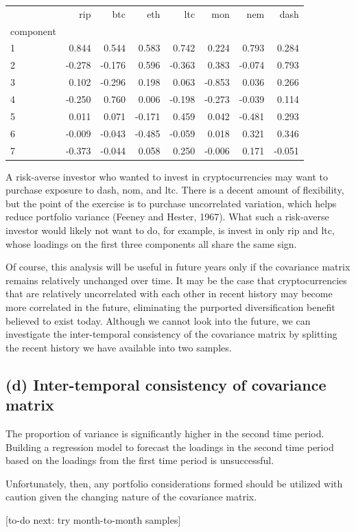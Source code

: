 \documentclass[12pt,twoside]{article}
\begin{document}
\begin{tabular}{lrrrrrrr}
	\toprule
	{} &    rip &    btc &    eth &    ltc &    mon &    nem &   dash \\
	component &        &        &        &        &        &        &        \\
	\midrule
	1         &  0.844 &  0.544 &  0.583 &  0.742 &  0.224 &  0.793 &  0.284 \\
	2         & -0.278 & -0.176 &  0.596 & -0.363 &  0.383 & -0.074 &  0.793 \\
	3         &  0.102 & -0.296 &  0.198 &  0.063 & -0.853 &  0.036 &  0.266 \\
	4         & -0.250 &  0.760 &  0.006 & -0.198 & -0.273 & -0.039 &  0.114 \\
	5         &  0.011 &  0.071 & -0.171 &  0.459 &  0.042 & -0.481 &  0.293 \\
	6         & -0.009 & -0.043 & -0.485 & -0.059 &  0.018 &  0.321 &  0.346 \\
	7         & -0.373 & -0.044 &  0.058 &  0.250 & -0.006 &  0.171 & -0.051 \\
	\bottomrule
\end{tabular}

A risk-averse investor who wanted to invest in cryptocurrencies may want to purchase exposure to dash, nom, and ltc. There is a decent amount of flexibility, but the point of the exercise is to purchase uncorrelated variation, which helps reduce portfolio variance (Feeney and Hester, 1967). What such a risk-averse investor would likely not want to do, for example, is invest in only rip and ltc, whose loadings on the first three components all share the same sign.

\bigbreak

Of course, this analysis will be useful in future years only if the covariance matrix remains relatively unchanged over time. It may be the case that cryptocurrencies that are relatively uncorrelated with each other in recent history may become more correlated in the future, eliminating the purported diversification benefit believed to exist today. Although we cannot look into the future, we can investigate the inter-temporal consistency of the covariance matrix by splitting the recent history we have available into two samples.

\subsection*{(d) Inter-temporal consistency of covariance matrix}

The proportion of variance is significantly higher in the second time period. Building a regression model to forecast the loadings in the second time period based on the loadings from the first time period is unsuccessful.

Unfortunately, then, any portfolio considerations formed should be utilized with caution given the changing nature of the covariance matrix.

[to-do next: try month-to-month samples]
\end{document}
